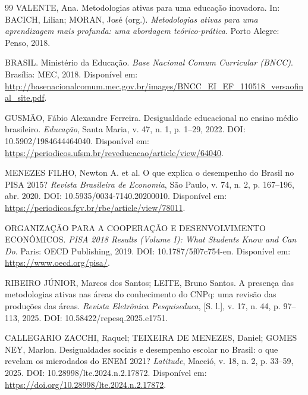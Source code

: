 \begin{thebibliography}{99}
VALENTE, Ana. Metodologias ativas para uma educação inovadora. In: BACICH, Lilian; MORAN, José (org.). \textit{Metodologias ativas para uma aprendizagem mais profunda: uma abordagem teórico-prática}. Porto Alegre: Penso, 2018.


BRASIL. Ministério da Educação. \textit{Base Nacional Comum Curricular (BNCC)}. Brasília: MEC, 2018. Disponível em: \url{http://basenacionalcomum.mec.gov.br/images/BNCC_EI_EF_110518_versaofinal_site.pdf}.

GUSMÃO, Fábio Alexandre Ferreira. Desigualdade educacional no ensino médio brasileiro. \textit{Educação}, Santa Maria, v. 47, n. 1, p. 1--29, 2022. DOI: 10.5902/1984644464040. Disponível em: \url{https://periodicos.ufsm.br/reveducacao/article/view/64040}.

MENEZES FILHO, Newton A. et al. O que explica o desempenho do Brasil no PISA 2015? \textit{Revista Brasileira de Economia}, São Paulo, v. 74, n. 2, p. 167--196, abr. 2020. DOI: 10.5935/0034-7140.20200010. Disponível em: \url{https://periodicos.fgv.br/rbe/article/view/78011}.

ORGANIZAÇÃO PARA A COOPERAÇÃO E DESENVOLVIMENTO ECONÔMICOS. \textit{PISA 2018 Results (Volume I): What Students Know and Can Do}. Paris: OECD Publishing, 2019. DOI: 10.1787/5f07c754-en. Disponível em: \url{https://www.oecd.org/pisa/}.

RIBEIRO JÚNIOR, Marcos dos Santos; LEITE, Bruno Santos. A presença das metodologias ativas nas áreas do conhecimento do CNPq: uma revisão das produções das áreas. \textit{Revista Eletrônica Pesquiseduca}, [S. l.], v. 17, n. 44, p. 97--113, 2025. DOI: 10.58422/repesq.2025.e1751.


CALLEGARIO ZACCHI, Raquel; TEIXEIRA DE MENEZES, Daniel; GOMES NEY, Marlon. Desigualdades sociais e desempenho escolar no Brasil: o que revelam os microdados do ENEM 2021? \textit{Latitude}, Maceió, v. 18, n. 2, p. 33--59, 2025. DOI: 10.28998/lte.2024.n.2.17872. Disponível em: \url{https://doi.org/10.28998/lte.2024.n.2.17872}.


\end{thebibliography}

